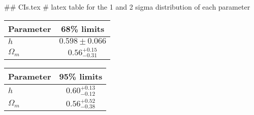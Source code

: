 ## CIs.tex
# latex table for the 1 and 2 sigma distribution of each parameter

\begin{tabular} { l  c}
 Parameter &  68\% limits\\
\hline
{\boldmath$h              $} & $0.598\pm 0.066            $\\
{\boldmath$\Omega_m       $} & $0.56^{+0.15}_{-0.31}      $\\
\hline
\end{tabular}

\begin{tabular} { l  c}
 Parameter &  95\% limits\\
\hline
{\boldmath$h              $} & $0.60^{+0.13}_{-0.12}      $\\
{\boldmath$\Omega_m       $} & $0.56^{+0.52}_{-0.38}      $\\
\hline
\end{tabular}

